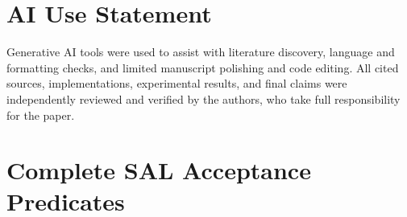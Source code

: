 \documentclass{article}
\begin{document}
\section*{AI Use Statement}

Generative AI tools were used to assist with literature discovery, language and formatting checks, and limited manuscript polishing and code editing. All cited sources, implementations, experimental results, and final claims were independently reviewed and verified by the authors, who take full responsibility for the paper.




\appendix

\section{Complete SAL Acceptance Predicates}
\label{app:gate}
\end{document}
